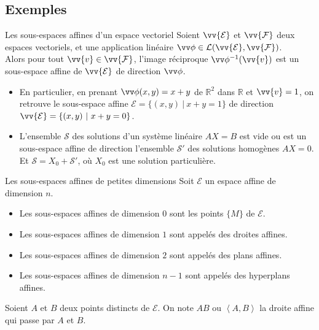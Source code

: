 \documentclass[aspectratio=1610 %
]{beamer}
\let\ens\mathcal
\let\ker\relax\DeclareMathOperator{\ker}{Ker}
\begin{document}
\subsection{Exemples}
  \begin{frame}{Les sous-espaces affines d'un espace vectoriel}
    Soient $\vv{\ens{E}}$ et $\vv{\ens{F}}$ deux espaces vectoriels, et une application linéaire $\vv\phi \in \mathcal{L}(\vv{\ens{E}},\vv{\ens{F}})$.\pause\\
    Alors pour tout $\vv{v}\in\vv{\ens{F}}$, l'image réciproque $\vv\phi^{-1}(\vv{v})$ est un sous-espace affine de $\vv{\ens{E}}$ de direction $\ker{\vv\phi}$.
    \begin{itemize}[<+(1)->]
      \item En particulier, en prenant $\vv\phi(x,y)=x+y$ de $\mathbb{R}^{2}$ dans $\mathbb{R}$ et $\vv{v}=1$, on retrouve le sous-espace affine $\ens{E}=\{(x,y)\ |\ x+y=1 \}$ de direction $\vv{\ens{E}}=\{(x,y)\ |\ x+y=0 \}$.
      \item L'ensemble $\mathcal{S}$ des solutions d'un système linéaire $AX=B$ est vide ou est un sous-espace affine de direction l'ensemble $\mathcal{S'}$ des solutions homogènes $AX=0$. Et $\mathcal{S}=X_{0}+\mathcal{S}'$, où $X_{0}$ est une solution particulière.
    \end{itemize}
  \end{frame}
  \begin{frame}{Les sous-espaces affines de petites dimensions}
    Soit $\ens{E}$ un espace affine de dimension $n$.
    \begin{itemize}[<+(1)->]
      \item Les sous-espaces affines de dimension $0$ sont les points $\{M\}$ de $\ens{E}$.
      \item Les sous-espaces affines de dimension $1$ sont appelés \alert{des droites affines}.
      \item Les sous-espaces affines de dimension $2$ sont appelés \alert{des plans affines}.
      \item Les sous-espaces affines de dimension $n-1$ sont appelés \alert{des hyperplans affines}.
    \end{itemize}\pause

    Soient $A$ et $B$ deux points distincts de $\ens{E}$. On note $AB$ ou $\left<A,B\right>$ la droite affine qui passe par $A$ et $B$.
  \end{frame}
\end{document}

